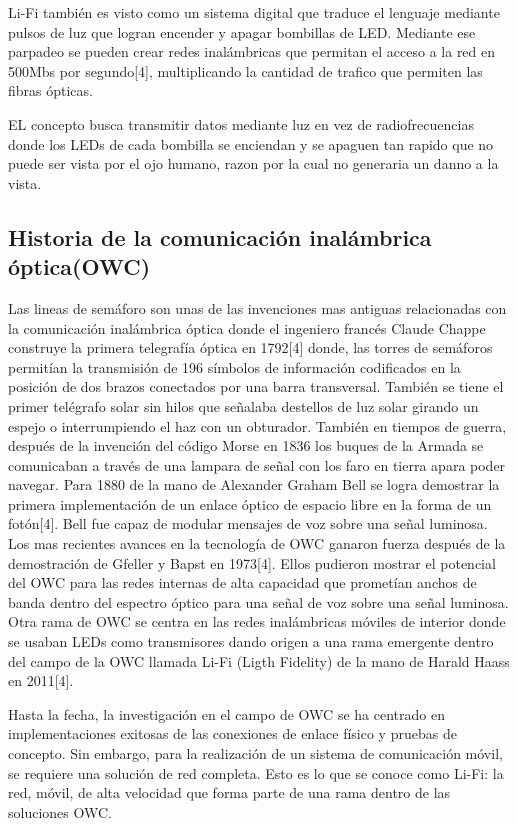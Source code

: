 \documentclass[10pt,journal,compsoc]{IEEEtran}
\begin{document}
Li-Fi también es visto como un sistema digital que traduce el lenguaje mediante pulsos de luz que logran encender y apagar bombillas de LED. Mediante ese parpadeo se pueden crear redes inalámbricas que permitan el acceso a la red en 500Mbs por segundo[4], multiplicando la cantidad de trafico que permiten las fibras ópticas. 

EL concepto busca transmitir datos mediante luz en vez de radiofrecuencias donde los LEDs de cada bombilla se enciendan y se apaguen tan rapido que no puede ser vista por el ojo humano, razon por la cual no generaria un danno a la vista.

\subsection{Historia de la comunicación inalámbrica óptica(OWC)}

Las lineas de semáforo son unas de las invenciones mas antiguas relacionadas con la comunicación inalámbrica óptica donde el ingeniero francés Claude Chappe construye la primera telegrafía óptica en 1792[4] donde, las torres de semáforos permitían la transmisión de 196 símbolos de información codificados en la posición de dos brazos conectados por una barra transversal. También se tiene el primer telégrafo solar sin hilos que señalaba destellos de luz solar girando un espejo o interrumpiendo el haz con un obturador. También en tiempos de guerra, después de la invención del código Morse en 1836 los buques de la Armada se comunicaban a través de una lampara de señal con los faro en tierra apara poder navegar. Para 1880 de la mano de Alexander Graham Bell se logra demostrar la primera implementación de un enlace óptico de espacio libre en la forma de un fotón[4]. Bell fue capaz de modular mensajes de voz sobre una señal luminosa. 
Los mas recientes avances en la tecnología de OWC ganaron fuerza después de la demostración de  Gfeller y Bapst en 1973[4]. Ellos pudieron mostrar el potencial del OWC para las redes internas de alta capacidad que prometían anchos de banda dentro del espectro óptico para una señal de voz sobre una señal luminosa. 
Otra rama de OWC se centra en las redes inalámbricas móviles de interior donde se usaban LEDs como transmisores dando origen a una rama emergente dentro del campo de la OWC llamada Li-Fi (Ligth Fidelity) de la mano de Harald Haass en 2011[4].

Hasta la fecha, la investigación en el campo de OWC se ha centrado en implementaciones exitosas de las conexiones de enlace físico y pruebas de concepto. Sin embargo, para la realización de un sistema de comunicación móvil, se requiere una solución de red completa. Esto es lo que se conoce como Li-Fi: la red, móvil, de alta velocidad que forma parte de una rama dentro de las  soluciones OWC.
\end{document}
